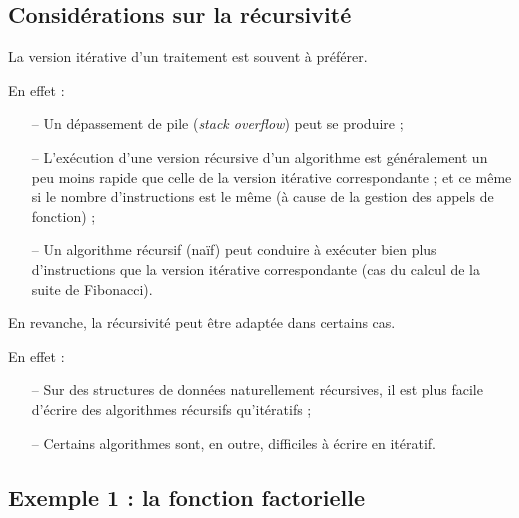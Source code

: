 




\subsection{Considérations sur la récursivité}

La version itérative d'un traitement est souvent à préférer.

En effet :
\begin{itemize}
	\item[--] Un dépassement de pile (\textit{stack overflow}) peut se produire ;
	\item[--] L'exécution d'une version récursive d'un algorithme est généralement un peu moins rapide 
			que celle de la version itérative correspondante ; 
			et ce même si le nombre d'instructions est le même (à cause de la gestion des appels de fonction) ;
	\item[--] Un algorithme récursif (naïf) peut conduire à exécuter bien plus d'instructions 
			que la version itérative correspondante (cas du calcul de la suite de Fibonacci).
\end{itemize}

\noindent
En revanche, la récursivité peut être adaptée dans certains cas.

En effet :
\begin{itemize}
	\item[--] Sur des structures de données naturellement récursives, 
	il est plus facile d'écrire des algorithmes récursifs qu'itératifs ;
	\item[--] Certains algorithmes sont, en outre, difficiles à écrire en itératif.
\end{itemize}


\subsection{Exemple 1 : la fonction factorielle}


